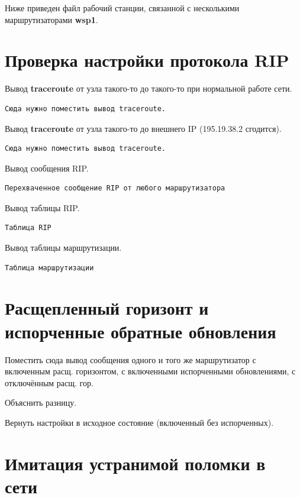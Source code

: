 \documentclass[a4paper,12pt]{article}
\begin{document}
Ниже приведен файл  рабочий станции, связанной с несколькими маршрутизаторами \textbf{wsp1}.



\section{Проверка настройки протокола RIP}

Вывод \textbf{traceroute} от узла такого-то до такого-то при нормальной работе сети.

\begin{Verbatim}
Сюда нужно поместить вывод traceroute.
\end{Verbatim}

Вывод \textbf{traceroute} от узла такого-то до внешнего IP (195.19.38.2 сгодится).

\begin{Verbatim}
Сюда нужно поместить вывод traceroute.
\end{Verbatim}

Вывод сообщения RIP.

\begin{Verbatim}
Перехваченное сообщение RIP от любого маршрутизатора
\end{Verbatim}

Вывод таблицы RIP.

\begin{Verbatim}
Таблица RIP
\end{Verbatim}

Вывод таблицы маршрутизации.

\begin{Verbatim}
Таблица маршрутизации
\end{Verbatim}

\section{Расщепленный горизонт и испорченные обратные обновления}

Поместить сюда вывод сообщения одного и того же маршрутизатор с включенным расщ. горизонтом, с включенными испорченными обновлениями, с отключённым расщ. гор.

Объяснить разницу.

Вернуть настройки в исходное состояние (включенный без испорченных).

\section{Имитация устранимой поломки в сети}
\end{document}
